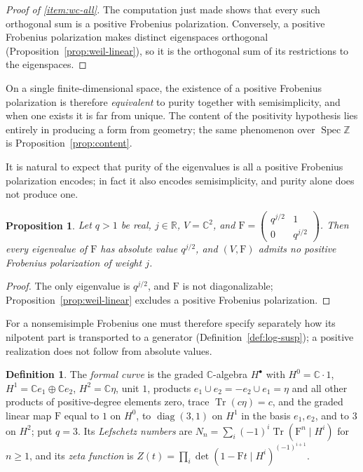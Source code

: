 \documentclass[11pt]{amsart}
\theoremstyle{plain}
\newtheorem{proposition}[theorem]{Proposition}
\theoremstyle{definition}
\newtheorem{definition}[theorem]{Definition}
\theoremstyle{remark}
\numberwithin{equation}{section}
\newcommand{\C}{\mathbb{C}}
\newcommand{\R}{\mathbb{R}}
\newcommand{\Z}{\mathbb{Z}}
\DeclareMathOperator{\Tr}{Tr}
\DeclareMathOperator{\Spec}{Spec}
\DeclareMathOperator{\diag}{diag}
\begin{document}
\begin{proof}[Proof of \ref{item:wc-all}]
The computation just made shows that every such orthogonal sum is a
positive Frobenius polarization. Conversely, a positive Frobenius
polarization makes distinct eigenspaces orthogonal
(Proposition~\ref{prop:weil-linear}), so it is the orthogonal sum of its
restrictions to the eigenspaces.
\end{proof}

On a single finite-dimensional space, the existence of a positive
Frobenius polarization is therefore \emph{equivalent} to purity
together with semisimplicity, and when one exists it is far from
unique. The content of the positivity hypothesis lies entirely in
producing a form from geometry; the same phenomenon over $\Spec\Z$ is
Proposition~\ref{prop:content}.

It is natural to expect that purity of the eigenvalues is all a
positive Frobenius polarization encodes; in fact it also encodes
semisimplicity, and purity alone does not produce one.

\begin{proposition}\label{prop:N-jordan}
Let $q>1$ be real, $j\in\R$, $V=\C^2$, and
$\mathrm{F}=\begin{pmatrix}q^{j/2}&1\\0&q^{j/2}\end{pmatrix}$. Then
every eigenvalue of $\mathrm{F}$ has absolute value $q^{j/2}$, and
$(V,\mathrm{F})$ admits no positive Frobenius polarization of weight
$j$.
\end{proposition}

\begin{proof}
The only eigenvalue is $q^{j/2}$, and $\mathrm{F}$ is not
diagonalizable; Proposition~\ref{prop:weil-linear} excludes a positive
Frobenius polarization.
\end{proof}

For a nonsemisimple Frobenius one must therefore specify separately how
its nilpotent part is transported to a generator
(Definition~\ref{def:log-susp}); a positive realization does not follow
from absolute values.

\begin{definition}\label{def:formal-curve}
The \emph{formal curve} is the graded $\C$-algebra $H^\bullet$ with
$H^0=\C\cdot1$, $H^1=\C e_1\oplus\C e_2$, $H^2=\C\eta$, unit $1$,
products $e_1\cup e_2=-e_2\cup e_1=\eta$ and all other products of
positive-degree elements zero, trace $\Tr(c\eta)=c$, and the graded
linear map $\mathrm{F}$ equal to $1$ on $H^0$, to $\diag(3,1)$ on $H^1$
in the basis $e_1,e_2$, and to $3$ on $H^2$; put $q=3$. Its
\emph{Lefschetz numbers} are $N_n=\sum_i(-1)^i\Tr(\mathrm{F}^n\mid H^i)$
for $n\ge1$, and its \emph{zeta function} is
$Z(t)=\prod_i\det(1-\mathrm{F}t\mid H^i)^{(-1)^{i+1}}$.
\end{definition}
\end{document}
